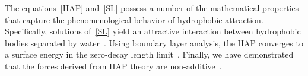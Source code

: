 The equations~\eqref{HAP} and~\eqref{SL} possess a number of the mathematical properties
that capture the phenomenological behavior of hydrophobic attraction.
Specifically, solutions of~\eqref{SL} yield an attractive interaction between
hydrophobic bodies separated by water~\cite{Eriksson1989}.
Using boundary layer analysis, the HAP converges to a surface energy in the zero-decay length
limit~\cite{Lee2018, Lin2015, Shibata2004}.
Finally, we have demonstrated that the forces derived from HAP theory are non-additive~\cite{Meyer2006, Fu2018_SIAM}. 

%
%
%
